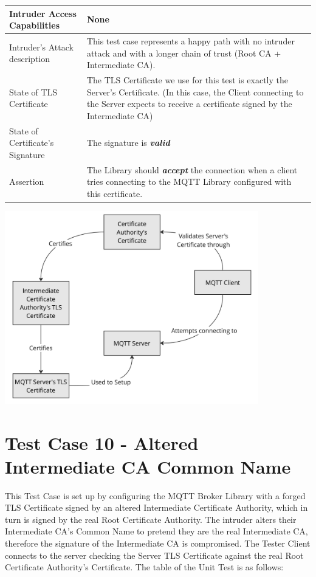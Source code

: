 \documentclass[binding=0.6cm,noexaminfo]{sapthesis}
\begin{document}
\begin{center}
\begin{tabular}{| p{6cm} | p{6cm} |}
\hline
Intruder Access Capabilities & None \\
\hline
Intruder’s Attack description & This test case represents a happy path with no intruder attack and with a longer chain of trust (Root CA + Intermediate CA). \\
\hline
State of TLS Certificate & The TLS Certificate we use for this test is exactly the Server’s Certificate. (In this case, the Client connecting to the Server expects to receive a certificate signed by the Intermediate CA) \\
\hline
State of Certificate’s Signature & The signature is \textbf{\textit{valid}} \\
\hline
Assertion & The Library should \textbf{\textit{accept}} the connection when a client tries connecting to the MQTT Library configured with this certificate. \\
\hline
\end{tabular}
\end{center}

\includegraphics[width=11cm]{TC9}

\section{Test Case 10 - Altered Intermediate CA Common Name}
This Test Case is set up by configuring the MQTT Broker Library with a forged TLS Certificate signed by an altered Intermediate Certificate Authority, which in turn is signed by the real Root Certificate Authority. The intruder alters their Intermediate CA’s Common Name to pretend they are the real Intermediate CA, therefore the signature of the Intermediate CA is compromised. The Tester Client connects to the server checking the Server TLS Certificate against the real Root Certificate Authority’s Certificate. The table of the Unit Test is as follows:
\end{document}
